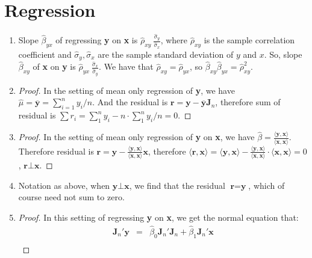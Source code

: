 \documentclass[12pt]{article}
\begin{document}
\section{Regression}

\begin{enumerate}
    \item 
    Slope $\hat{\beta}_{yx}$ of regressing \textbf{y} on \textbf{x} is $\hat{\rho}_{xy}\ \frac{\hat{\sigma}_y}{\hat{\sigma}_x}$, where $\hat{\rho}_{xy}$ is the sample correlation coefficient and $\hat{\sigma}_y, \hat{\sigma}_x$ are the sample standard deviation of $y$ and $x$.
    So, slope $\hat{\beta}_{xy}$ of \textbf{x} on \textbf{y} is $\hat{\rho}_{yx}\ \frac{\hat{\sigma}_x}{\hat{\sigma}_y}$.
    We have that $\hat{\rho}_{xy} = \hat{\rho}_{yx}$, so $\hat{\beta}_{xy} \hat{\beta}_{yx} = \hat{\rho}_{xy}^2$.
    \item
    \begin{proof}
        In the setting of mean only regression of \textbf{y}, we have $\hat{\mu} = \overline{\textbf{y}} = \sum_{i=1}^n y_i / n$.
        And the residual is $\textbf{r} = \textbf{y} - \overline{\textbf{y}} \textbf{J}_n$, therefore sum of residual is $\sum r_i = \sum_1^n y_i - n \cdot \sum_1^n y_i / n = 0$.
    \end{proof}
    \item
    \begin{proof}
        In the setting of mean only regression of \textbf{y} on \textbf{x}, we have $\hat{\beta} = \frac{\langle \textbf{y}, \textbf{x} \rangle}{\langle \textbf{x}, \textbf{x} \rangle}$.
        Therefore residual is $\textbf{r} = \textbf{y} - \frac{\langle \textbf{y}, \textbf{x} \rangle}{\langle \textbf{x}, \textbf{x} \rangle} \textbf{x}$, therefore $\langle \textbf{r}, \textbf{x} \rangle = \langle \textbf{y}, \textbf{x} \rangle - \frac{\langle \textbf{y}, \textbf{x} \rangle}{\langle \textbf{x}, \textbf{x} \rangle}\cdot\langle \textbf{x}, \textbf{x} \rangle = 0$, $\textbf{r} \bot \textbf{x}$.
    \end{proof}
    \item
    Notation as above, when $\textbf{y} \bot \textbf{x}$, we find that the residual $\textbf{r} = \textbf{y}$, which of course need not sum to zero.
    \item
    \begin{proof}
        In this setting of regressing \textbf{y} on \textbf{x}, we get the normal equation that:
        \begin{eqnarray}
            \textbf{J}_n'\textbf{y} &=& \hat{\beta}_0 \textbf{J}_n'\textbf{J}_n + \hat{\beta}_1 \textbf{J}_n'\textbf{x} \\

\end{eqnarray}
\end{proof}
\end{enumerate}
\end{document}

